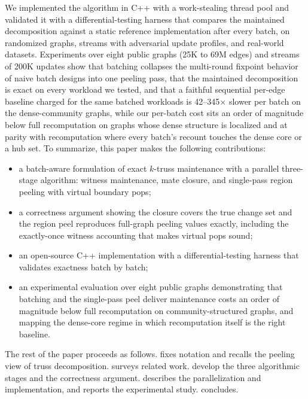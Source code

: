 We implemented the algorithm in C++ with a work-stealing thread pool and validated it with a differential-testing harness that compares the maintained decomposition against a static reference implementation after every batch, on randomized graphs, streams with adversarial update profiles, and real-world datasets.
Experiments over eight public graphs (25K to 69M edges) and streams of 200K updates show that batching collapses the multi-round fixpoint behavior of naive batch designs into one peeling pass, that the maintained decomposition is exact on every workload we tested, and that a faithful sequential per-edge baseline charged for the same batched workloads is 42--345$\times$ slower per batch on the dense-community graphs, while our per-batch cost sits an order of magnitude below full recomputation on graphs whose dense structure is localized and at parity with recomputation where every batch's recount touches the dense core or a hub set.
To summarize, this paper makes the following contributions:
\begin{itemize}
\item a batch-aware formulation of exact $k$-truss maintenance with a parallel three-stage algorithm: witness maintenance, mate closure, and single-pass region peeling with virtual boundary pops;
\item a correctness argument showing the closure covers the true change set and the region peel reproduces full-graph peeling values exactly, including the exactly-once witness accounting that makes virtual pops sound;
\item an open-source C++ implementation with a differential-testing harness that validates exactness batch by batch;
\item an experimental evaluation over eight public graphs demonstrating that batching and the single-pass peel deliver maintenance costs an order of magnitude below full recomputation on community-structured graphs, and mapping the dense-core regime in which recomputation itself is the right baseline.
\end{itemize}

The rest of the paper proceeds as follows.
 fixes notation and recalls the peeling view of truss decomposition.
 surveys related work.
 develop the three algorithmic stages and the correctness argument.
 describes the parallelization and implementation, and  reports the experimental study.
 concludes.
